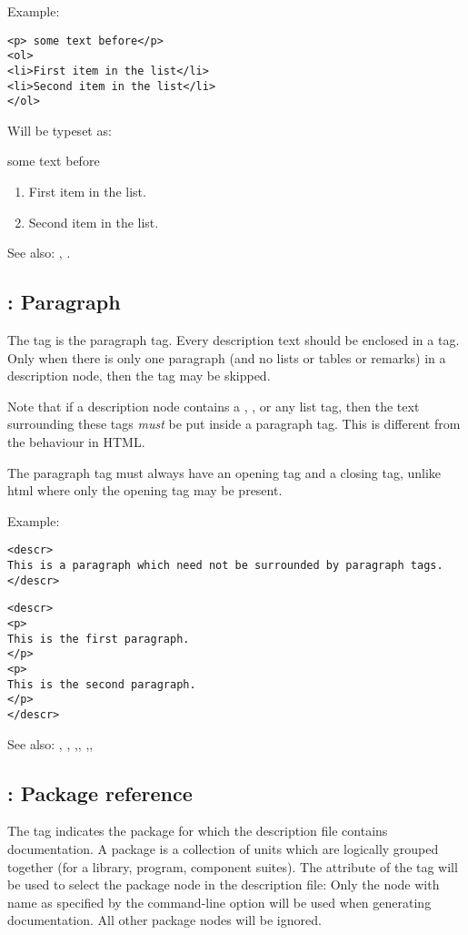 Example:
\begin{verbatim}
<p> some text before</p>
<ol>
<li>First item in the list</li>
<li>Second item in the list</li>
</ol>
\end{verbatim}
Will be typeset as:

some text before
\begin{enumerate}
\item First item in the list.
\item Second item in the list.
\end{enumerate}

See also: , .


\subsection{ : Paragraph}
\label{tag:p}
The  tag is the paragraph tag. Every description text should be 
enclosed in a  tag. Only when there is only one paragraph (and no
lists or tables or remarks) in a description node, then the  tag  may
be skipped.

Note that if a description node contains a , , 
or any list tag, then the text surrounding these tags {\em must} be  put 
inside a  paragraph tag. This is different from the behaviour in HTML.

The paragraph tag must always have an opening tag and a closing tag, unlike
html where only the opening tag may be present.

Example:
\begin{verbatim}
<descr>
This is a paragraph which need not be surrounded by paragraph tags.
</descr>
\end{verbatim}
\begin{verbatim}
<descr>
<p>
This is the first paragraph.
</p>
<p>
This is the second paragraph.
</p>
</descr>
\end{verbatim}

See also: , , ,,
,,

\subsection{ : Package reference}
\label{tag:package}
The  tag indicates the package for which the description file
contains documentation. A package is a collection of units which are
logically grouped together (for a library, program, component suites). The
 attribute of the  tag will be used to select the
package node in the description file: Only the  node with name as
specified by the  command-line option will be used when
generating documentation. All other package nodes will be ignored.

